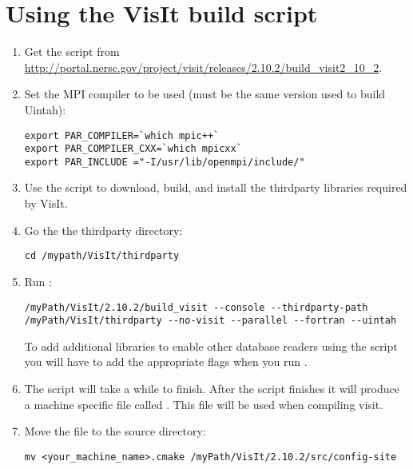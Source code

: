 \documentclass[11pt,fleqn]{book} %
\begin{document}
\section{Using the VisIt build script}
\begin{enumerate}
  \item Get the  script from \url{http://portal.nersc.gov/project/visit/releases/2.10.2/build_visit2_10_2}.

  \item Set the MPI compiler to be used (must be the same version used to build Uintah):
\begin{lstlisting}[backgroundcolor=\color{background}]
export PAR_COMPILER=`which mpic++` 
export PAR_COMPILER_CXX=`which mpicxx` 
export PAR_INCLUDE ="-I/usr/lib/openmpi/include/"
\end{lstlisting}

  \item Use the  script to download, build, and install the thirdparty 
        libraries required by VisIt. 

  \item Go the the \Visit thirdparty directory:
\begin{lstlisting}[backgroundcolor=\color{background}]
cd /mypath/VisIt/thirdparty
\end{lstlisting}

  \item Run :
\begin{lstlisting}[backgroundcolor=\color{background}]
/myPath/VisIt/2.10.2/build_visit --console --thirdparty-path /myPath/VisIt/thirdparty --no-visit --parallel --fortran --uintah
\end{lstlisting}
       \begin{NoteBox}
       To add additional libraries to enable other database readers using the  script 
       you will have to add the appropriate flags when you run .
       \end{NoteBox}

  \item The  script will take a while to finish.  After the script finishes it 
        will produce a machine specific  file called 
        . This file will be used when 
        compiling visit. 

  \item Move the  file
        to the \Visit source  directory:
\begin{lstlisting}[backgroundcolor=\color{background}]
mv <your_machine_name>.cmake /myPath/VisIt/2.10.2/src/config-site
\end{lstlisting}


\end{enumerate}
\end{document}
